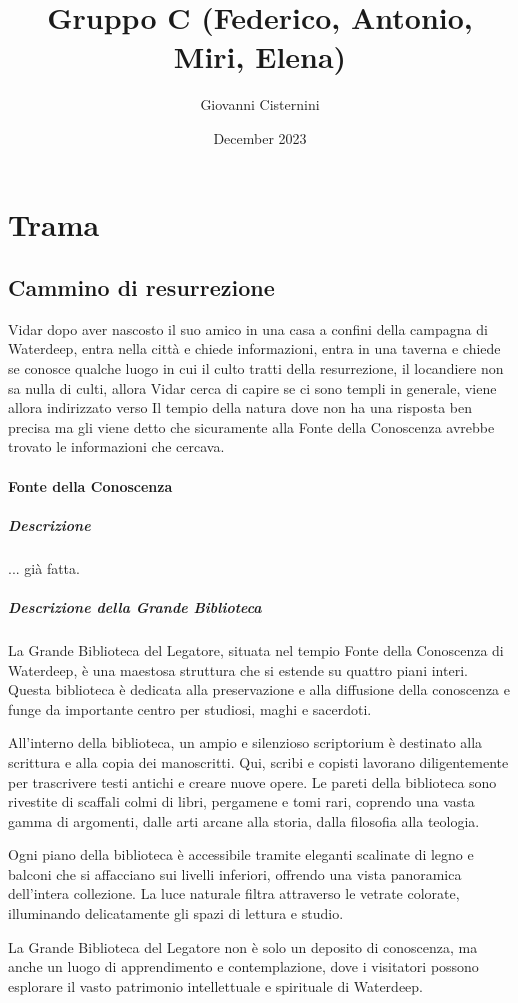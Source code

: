 \documentclass{article}
\title{Gruppo C (Federico, Antonio, Miri, Elena)}
\author{Giovanni Cisternini}
\date{December 2023}
\begin{document}
\tableofcontents



\section{Trama}



\subsection{Cammino di resurrezione}
Vidar dopo aver nascosto il suo amico in una casa a confini della campagna di Waterdeep, entra nella città e chiede informazioni, entra in una taverna e chiede se conosce qualche luogo in cui il culto tratti della resurrezione, il locandiere non sa nulla di culti, allora Vidar cerca di capire se ci sono templi in generale, viene allora indirizzato verso Il tempio della natura dove non ha una risposta ben precisa ma gli viene detto che sicuramente alla Fonte della Conoscenza avrebbe trovato le informazioni che cercava. 
\paragraph{Fonte della Conoscenza}
    \subparagraph{Descrizione} ... già fatta.

  
    \subparagraph{Descrizione della Grande Biblioteca}
    La Grande Biblioteca del Legatore, situata nel tempio Fonte della Conoscenza di Waterdeep, è una maestosa struttura che si estende su quattro piani interi. Questa biblioteca è dedicata alla preservazione e alla diffusione della conoscenza e funge da importante centro per studiosi, maghi e sacerdoti.
    
    All'interno della biblioteca, un ampio e silenzioso scriptorium è destinato alla scrittura e alla copia dei manoscritti. Qui, scribi e copisti lavorano diligentemente per trascrivere testi antichi e creare nuove opere. Le pareti della biblioteca sono rivestite di scaffali colmi di libri, pergamene e tomi rari, coprendo una vasta gamma di argomenti, dalle arti arcane alla storia, dalla filosofia alla teologia.
    
    Ogni piano della biblioteca è accessibile tramite eleganti scalinate di legno e balconi che si affacciano sui livelli inferiori, offrendo una vista panoramica dell'intera collezione. La luce naturale filtra attraverso le vetrate colorate, illuminando delicatamente gli spazi di lettura e studio.
    
    La Grande Biblioteca del Legatore non è solo un deposito di conoscenza, ma anche un luogo di apprendimento e contemplazione, dove i visitatori possono esplorare il vasto patrimonio intellettuale e spirituale di Waterdeep.
    
\end{document}

